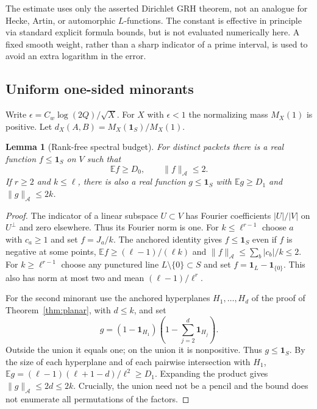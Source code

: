 \documentclass[11pt]{article}
\newtheorem{lemma}[theorem]{Lemma}
\theoremstyle{remark}\newtheorem{remark}[theorem]{Remark}
\newcommand{\E}{\mathbb E}
\newcommand{\one}{\mathbf 1}
\newcommand{\normA}[1]{\lVert #1\rVert_{\mathcal A}}
\begin{document}
The estimate uses only the asserted Dirichlet GRH theorem, not an analogue for Hecke, Artin, or automorphic $L$-functions. The constant is effective in principle via standard explicit formula bounds, but is not evaluated numerically here. A fixed smooth weight, rather than a sharp indicator of a prime interval, is used to avoid an extra logarithm in the error.

\subsection{Uniform one-sided minorants}
Write $\epsilon=C_w\log(2Q)/\sqrt X$. For $X$ with $\epsilon<1$ the normalizing mass $M_X(1)$ is positive. Let $d_X(A,B)=M_X(\one_S)/M_X(1)$.
\begin{lemma}[Rank-free spectral budget]\label{lem:minorant}
For distinct packets there is a real function $f\le\one_S$ on $V$ such that
\[\E f\ge D_0,\qquad \normA f\le2.\]
If $r\ge2$ and $k\le\ell$, there is also a real function $g\le\one_S$ with $\E g\ge D_1$ and $\normA g\le2k$.
\end{lemma}
\begin{proof}
The indicator of a linear subspace $U\subset V$ has Fourier coefficients $|U|/|V|$ on $U^\perp$ and zero elsewhere. Thus its Fourier norm is one. For $k\le\ell^{r-1}$ choose $a$ with $c_a\ge1$ and set $f=J_a/k$. The anchored identity gives $f\le\one_S$ even if $f$ is negative at some points, $\E f\ge(\ell-1)/(\ell k)$ and $\normA f\le\sum_b|c_b|/k\le2$. For $k\ge\ell^{r-1}$ choose any punctured line $L\setminus\{0\}\subset S$ and set $f=\one_L-\one_{\{0\}}$. This also has norm at most two and mean $(\ell-1)/\ell^r$.

For the second minorant use the anchored hyperplanes $H_1,\ldots,H_d$ of the proof of Theorem~\ref{thm:planar}, with $d\le k$, and set
\[
 g=(1-\one_{H_1})\left(1-\sum_{j=2}^d\one_{H_j}\right).
\]
Outside the union it equals one; on the union it is nonpositive. Thus $g\le\one_S$. By the size of each hyperplane and of each pairwise intersection with $H_1$, $\E g=(\ell-1)(\ell+1-d)/\ell^2\ge D_1$. Expanding the product gives $\normA g\le2d\le2k$. Crucially, the union need not be a pencil and the bound does not enumerate all permutations of the factors.
\end{proof}
\end{document}
